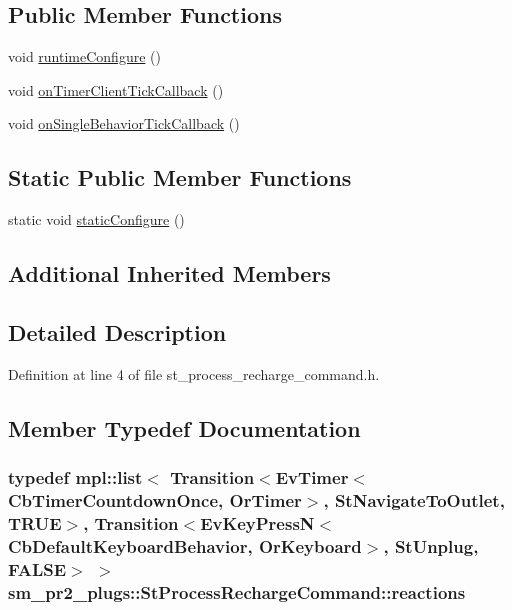 \subsection*{Public Member Functions}
\begin{DoxyCompactItemize}
\item 
void \hyperlink{structsm__pr2__plugs_1_1StProcessRechargeCommand_ae401a2e897f446ddbde833e7686fcd7a}{runtime\+Configure} ()
\item 
void \hyperlink{structsm__pr2__plugs_1_1StProcessRechargeCommand_a71c620cbe618019ad7338c9b88639c68}{on\+Timer\+Client\+Tick\+Callback} ()
\item 
void \hyperlink{structsm__pr2__plugs_1_1StProcessRechargeCommand_acc2a9e8dbb67f236e16eafb4db51c3c5}{on\+Single\+Behavior\+Tick\+Callback} ()
\end{DoxyCompactItemize}
\subsection*{Static Public Member Functions}
\begin{DoxyCompactItemize}
\item 
static void \hyperlink{structsm__pr2__plugs_1_1StProcessRechargeCommand_ad4c6ec976c76402dd0fe6002036d2462}{static\+Configure} ()
\end{DoxyCompactItemize}
\subsection*{Additional Inherited Members}


\subsection{Detailed Description}


Definition at line 4 of file st\+\_\+process\+\_\+recharge\+\_\+command.\+h.



\subsection{Member Typedef Documentation}
\subsubsection[{\texorpdfstring{reactions}{reactions}}]{\setlength{\rightskip}{0pt plus 5cm}typedef mpl\+::list$<$ Transition$<$Ev\+Timer$<$Cb\+Timer\+Countdown\+Once, {\bf Or\+Timer}$>$, {\bf St\+Navigate\+To\+Outlet}, {\bf T\+R\+UE}$>$, Transition$<$Ev\+Key\+PressN$<$Cb\+Default\+Keyboard\+Behavior, {\bf Or\+Keyboard}$>$, {\bf St\+Unplug}, {\bf F\+A\+L\+SE}$>$ $>$ {\bf sm\+\_\+pr2\+\_\+plugs\+::\+St\+Process\+Recharge\+Command\+::reactions}}\hypertarget{structsm__pr2__plugs_1_1StProcessRechargeCommand_a97c8363f0989dc9dabc36a20445ba569}{}\label{structsm__pr2__plugs_1_1StProcessRechargeCommand_a97c8363f0989dc9dabc36a20445ba569}


